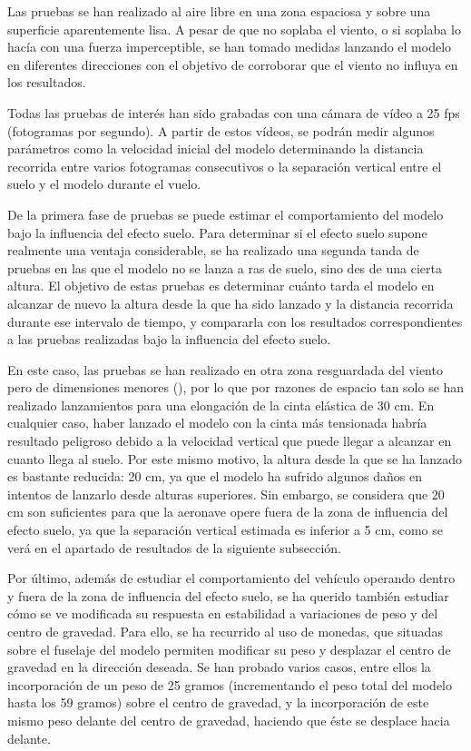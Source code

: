 Las pruebas se han realizado al aire libre en una zona espaciosa y sobre una superficie aparentemente lisa. A pesar de que no soplaba el viento, o si soplaba lo hacía con una fuerza imperceptible, se han tomado medidas lanzando el modelo en diferentes direcciones con el objetivo de corroborar que el viento no influya en los resultados.

Todas las pruebas de interés han sido grabadas con una cámara de vídeo a 25 fps (fotogramas por segundo). A partir de estos vídeos, se podrán medir algunos parámetros como la velocidad inicial del modelo determinando la distancia recorrida entre varios fotogramas consecutivos o la separación vertical entre el suelo y el modelo durante el vuelo.

De la primera fase de pruebas se puede estimar el comportamiento del modelo bajo la influencia del efecto suelo. Para determinar si el efecto suelo supone realmente una ventaja considerable, se ha realizado una segunda tanda de pruebas en las que el modelo no se lanza a ras de suelo, sino des de una cierta altura. El objetivo de estas pruebas es determinar cuánto tarda el modelo en alcanzar de nuevo la altura desde la que ha sido lanzado y la distancia recorrida durante ese intervalo de tiempo, y compararla con los resultados correspondientes a las pruebas realizadas bajo la influencia del efecto suelo.

En este caso, las pruebas se han realizado en otra zona resguardada del viento pero de dimensiones menores (), por lo que por razones de espacio tan solo se han realizado lanzamientos para una elongación de la cinta elástica de 30 cm. En cualquier caso, haber lanzado el modelo con la cinta más tensionada habría resultado peligroso debido a la velocidad vertical que puede llegar a alcanzar en cuanto llega al suelo. Por este mismo motivo, la altura desde la que se ha lanzado es bastante reducida: 20 cm, ya que el modelo ha sufrido algunos daños en intentos de lanzarlo desde alturas superiores. Sin embargo, se considera que 20 cm son suficientes para que la aeronave opere fuera de la zona de influencia del efecto suelo, ya que la separación vertical estimada es inferior a 5 cm, como se verá en el apartado de resultados de la siguiente subsección.

Por último, además de estudiar el comportamiento del vehículo operando dentro y fuera de la zona de influencia del efecto suelo, se ha querido también estudiar cómo se ve modificada su respuesta en estabilidad a variaciones de peso y del centro de gravedad. Para ello, se ha recurrido al uso de monedas, que situadas sobre el fuselaje del modelo permiten modificar su peso y desplazar el centro de gravedad en la dirección deseada. Se han probado varios casos, entre ellos la incorporación de un peso de 25 gramos (incrementando el peso total del modelo hasta los 59 gramos) sobre el centro de gravedad, y la incorporación de este mismo peso delante del centro de gravedad, haciendo que éste se desplace hacia delante.

